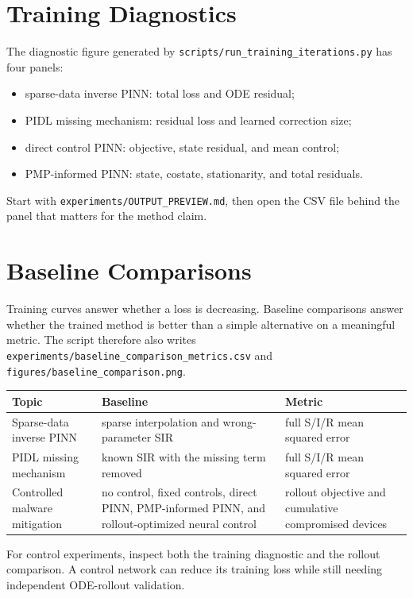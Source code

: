 \documentclass[11pt,a4paper]{article}
\begin{document}
\section{Training Diagnostics}
The diagnostic figure generated by \texttt{scripts/run\_training\_iterations.py} has four panels:
\begin{itemize}
\item sparse-data inverse PINN: total loss and ODE residual;
\item PIDL missing mechanism: residual loss and learned correction size;
\item direct control PINN: objective, state residual, and mean control;
\item PMP-informed PINN: state, costate, stationarity, and total residuals.
\end{itemize}
Start with \texttt{experiments/OUTPUT\_PREVIEW.md}, then open the CSV file behind the panel that matters for the method claim.

\section{Baseline Comparisons}
Training curves answer whether a loss is decreasing. Baseline comparisons answer whether the trained method is better than a simple alternative on a meaningful metric. The script therefore also writes \texttt{experiments/baseline\_comparison\_metrics.csv} and \texttt{figures/baseline\_comparison.png}.

\begin{longtable}{p{}p{}p{}}
\toprule
Topic & Baseline & Metric \\
\midrule
Sparse-data inverse PINN & sparse interpolation and wrong-parameter SIR & full S/I/R mean squared error \\
PIDL missing mechanism & known SIR with the missing term removed & full S/I/R mean squared error \\
Controlled malware mitigation & no control, fixed controls, direct PINN, PMP-informed PINN, and rollout-optimized neural control & rollout objective and cumulative compromised devices \\
\bottomrule
\end{longtable}

For control experiments, inspect both the training diagnostic and the rollout comparison. A control network can reduce its training loss while still needing independent ODE-rollout validation.
\end{document}
